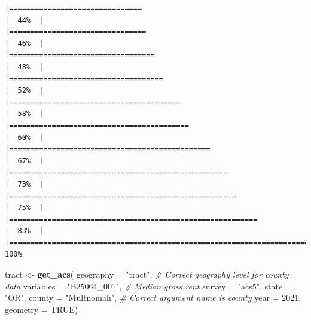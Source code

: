 \documentclass[
]{article}
\newenvironment{Shaded}{\begin{snugshade}}{\end{snugshade}}
\newcommand{\AttributeTok}[1]{\textcolor[rgb]{0.13,0.29,0.53}{#1}}
\newcommand{\CommentTok}[1]{\textcolor[rgb]{0.56,0.35,0.01}{\textit{#1}}}
\newcommand{\ConstantTok}[1]{\textcolor[rgb]{0.56,0.35,0.01}{#1}}
\newcommand{\DecValTok}[1]{\textcolor[rgb]{0.00,0.00,0.81}{#1}}
\newcommand{\FunctionTok}[1]{\textcolor[rgb]{0.13,0.29,0.53}{\textbf{#1}}}
\newcommand{\NormalTok}[1]{#1}
\newcommand{\OtherTok}[1]{\textcolor[rgb]{0.56,0.35,0.01}{#1}}
\newcommand{\StringTok}[1]{\textcolor[rgb]{0.31,0.60,0.02}{#1}}
\begin{document}
\begin{verbatim}
|===============================                                       |  44%  |                                                                              |================================                                      |  46%  |                                                                              |==================================                                    |  48%  |                                                                              |====================================                                  |  52%  |                                                                              |========================================                              |  58%  |                                                                              |==========================================                            |  60%  |                                                                              |===============================================                       |  67%  |                                                                              |===================================================                   |  73%  |                                                                              |=====================================================                 |  75%  |                                                                              |==========================================================            |  83%  |                                                                              |======================================================================| 100%
\end{verbatim}

\begin{Shaded}
\begin{Highlighting}[]
\NormalTok{tract }\OtherTok{\textless{}{-}} \FunctionTok{get\_acs}\NormalTok{(}
  \AttributeTok{geography =} \StringTok{"tract"}\NormalTok{, }\CommentTok{\# Correct geography level for county data}
  \AttributeTok{variables =} \StringTok{"B25064\_001"}\NormalTok{, }\CommentTok{\# Median gross rent}
  \AttributeTok{survey =} \StringTok{"acs5"}\NormalTok{, }
  \AttributeTok{state =} \StringTok{"OR"}\NormalTok{,}
  \AttributeTok{county =} \StringTok{"Multnomah"}\NormalTok{, }\CommentTok{\# Correct argument name is \textquotesingle{}county\textquotesingle{}}
  \AttributeTok{year =} \DecValTok{2021}\NormalTok{,}
  \AttributeTok{geometry =} \ConstantTok{TRUE}\NormalTok{)}
\end{Highlighting}
\end{Shaded}
\end{document}
